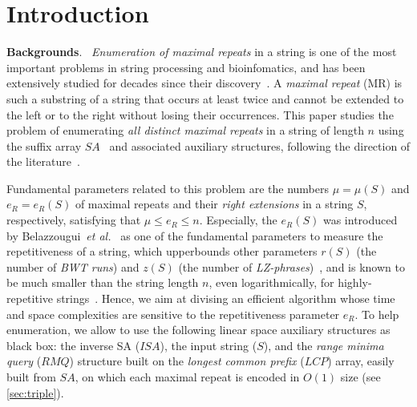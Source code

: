 
\section{Introduction}
\label{sec:intro}
\textbf{Backgrounds}.\ 
\textit{Enumeration of maximal repeats} in a string is one of the most important problems in string processing and bioinfomatics, and has been extensively studied for decades since their discovery~\cite{blumer1987complete,crochemore:verin1997compact,raffinot2001maximal}. 
A \textit{maximal repeat} (MR) is such a substring of a string that occurs at least twice and cannot be extended to the left or to the right without losing their occurrences. 
This paper studies the problem of enumerating \textit{all distinct maximal repeats} in a string of length $n$ using the suffix array $SA$~\cite{manber:myers1993suffixarrays} and associated auxiliary structures, following the direction of the literature~\cite{narisawa2007efficient,okanohara2009text,beller:berger2012space:efficient:bbo,belazzougui2020linear,nishimoto:cpm2021enum}.

Fundamental parameters related to this problem are the numbers $\mu = \mu(S)$ and $e_R = e_R(S)$ of maximal repeats and their \textit{right extensions} in a string $S$, respectively, satisfying that $\mu \le e_R\le n$.
Especially, the $e_R(S)$ was introduced by Belazzougui~\textit{et al.}~\cite{belazzougui:cunial:gagie:prezza:raffinot2015composite} as one of the fundamental parameters to measure the repetitiveness of a string, which upperbounds other parameters $r(S)$ (the number of \textit{BWT runs}) and $z(S)$ (the number of \textit{LZ-phrases})~\cite{belazzougui:cunial:gagie:prezza:raffinot2015composite}, and is known to be much smaller than the string length $n$, even logarithmically, for highly-repetitive strings~\cite{radoszewski:rytter2012structure:cdawg:thuemorse}. Hence, we aim at divising an efficient algorithm whose time and space complexities are sensitive to the repetitiveness parameter $e_R$. 
To help enumeration, we allow to use the following linear space auxiliary structures as black box: the inverse SA ($ISA$), the input string ($S$), and the \textit{range minima query} ($RMQ$) structure built on the \textit{longest common prefix} ($LCP$) array, easily built from $SA$, on which each maximal repeat is encoded in $O(1)$ size (see \cref{sec:triple}). 

